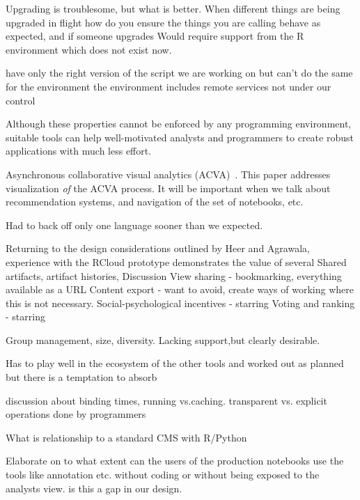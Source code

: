 Upgrading is troublesome, but what is better. When different things are being
upgraded in flight how do you ensure the things you are calling behave as
expected, and if someone upgrades 
Would require support from the R environment which does not exist now.

have only the right version of the script we are working on but
can't do the same for the environment
the environment includes remote services not under our control

Although these properties cannot be enforced by any programming environment,
suitable tools can help well-motivated analysts and programmers to create
robust applications with much less effort.

Asynchronous collaborative visual analytics
(ACVA)~\cite{Chen:2011:SEC}. This paper addresses visualization
\emph{of} the ACVA process. It will be important when we talk about
recommendation systems, and navigation of the set of notebooks, etc.

Had to back off only one language sooner than we expected.

Returning to the design considerations outlined by Heer and Agrawala, experience with the RCloud prototype demonstrates the value of several
Shared artifacts, artifact histories, 
Discussion
View sharing - bookmarking, everything available as a URL
Content export - want to avoid, create ways of working where this is not necessary.
Social-psychological incentives - starring
Voting and ranking - starring

Group management, size, diversity.  Lacking support,but clearly desirable.

Has to play well in the ecosystem of the other tools and worked out as planned but there is a temptation to absorb 

discussion about binding times, running vs.caching.
transparent vs. explicit operations done by programmers

What is relationship to a standard CMS with R/Python

Elaborate on to what extent can the users of the production notebooks use the tools like annotation etc. without coding or without being exposed to the analysts view. is this a gap in our design.
